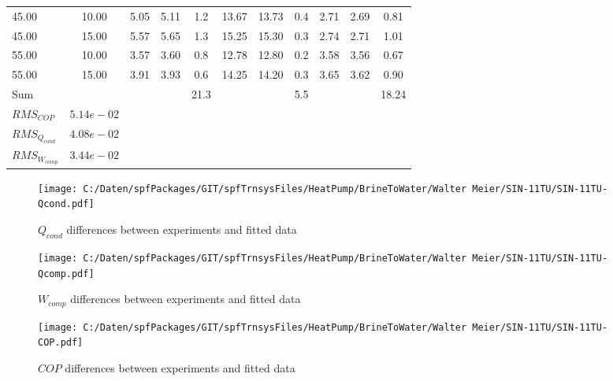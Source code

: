 \documentclass[english]{SPFShortReport}
\begin{document}
\begin{table}[!ht]
\begin{small}
\begin{center}
{\begin{tabular}{l | c c c c c c c c c c }
45.00  & 10.00 & 5.05 & 5.11 & 1.2 & 13.67 & 13.73 & 0.4 & 2.71 & 2.69 & 0.81\\ 
45.00  & 15.00 & 5.57 & 5.65 & 1.3 & 15.25 & 15.30 & 0.3 & 2.74 & 2.71 & 1.01\\ 
55.00  & 10.00 & 3.57 & 3.60 & 0.8 & 12.78 & 12.80 & 0.2 & 3.58 & 3.56 & 0.67\\ 
55.00  & 15.00 & 3.91 & 3.93 & 0.6 & 14.25 & 14.20 & 0.3 & 3.65 & 3.62 & 0.90\\ 
\hline 
 Sum &  & &  & 21.3 &  &  & 5.5 & &  & 18.24\\ 
\hline 
 $RMS_{COP}$ & $5.14e-02$ \\ 
 $RMS_{Q_{cond}}$ & $4.08e-02$ \\ 
 $RMS_{W_{comp}}$ & $3.44e-02$ \\ 
\hline
\hline
\end{tabular}
}
\label{ErrorsTable}
\end{center}
\end{small}
\end{table}
\begin{figure}[!ht]
\begin{center}
\texttt{[image: C:/Daten/spfPackages/GIT/spfTrnsysFiles/HeatPump/BrineToWater/Walter Meier/SIN-11TU/SIN-11TU-Qcond.pdf]}
\caption{$Q_{cond}$ differences between experiments and fitted data}
\label{QcongFig}
\end{center}
\end{figure}
\begin{figure}[!ht]
\begin{center}
\texttt{[image: C:/Daten/spfPackages/GIT/spfTrnsysFiles/HeatPump/BrineToWater/Walter Meier/SIN-11TU/SIN-11TU-Qcomp.pdf]}
\caption{$W_{comp}$ differences between experiments and fitted data}
\label{QcompFig}
\end{center}
\end{figure}
\begin{figure}[!ht]
\begin{center}
\texttt{[image: C:/Daten/spfPackages/GIT/spfTrnsysFiles/HeatPump/BrineToWater/Walter Meier/SIN-11TU/SIN-11TU-COP.pdf]}
\caption{$COP$ differences between experiments and fitted data}
\label{COPFig}
\end{center}
\end{figure}
\end{document}
